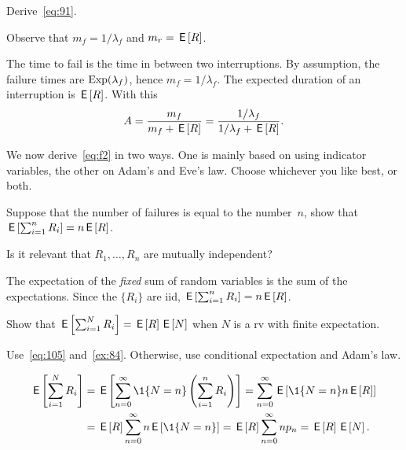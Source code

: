 \begin{exercise}\label{ex:80}
 Derive~\cref{eq:91}.
\begin{hint}
 Observe that $m_f = 1/\lambda_f$ and $m_r = \,\mathsf{E}\left[R\right]$.
\end{hint}
\begin{solution}
  The time to fail is the time in between two interruptions.
  By assumption, the failure times are $\mathrm{Exp}(\lambda_f)$, hence $m_f = 1/\lambda_f$.
  The expected duration of an interruption is $\,\mathsf{E}\left[R\right]$.   With this
\begin{equation*}
 A=\frac{m_f}{m_f + \,\mathsf{E}\left[R\right]}=\frac{1/\lambda_f }{1/\lambda_f + \,\mathsf{E}\left[R\right]}.
\end{equation*}
\end{solution}
\end{exercise}

We now derive~\cref{eq:f2} in two ways. One is mainly based on using indicator variables, the other on Adam's and Eve's law. Choose whichever you like best, or both.


\begin{exercise}\label{ex:84}
 Suppose that the number of failures is equal to the number~$n$, show that $\,\mathsf{E}\left[\sum_{i=1}^n R_i\right]=n\,\mathsf{E}\left[R\right]$.
\begin{hint}
 Is it relevant that $R_1,\ldots, R_n$ are mutually independent?
\end{hint}
\begin{solution}
  The expectation of the \emph{fixed} sum of random variables is  the sum of the expectations. Since the $\{R_i\}$ are iid,
$\,\mathsf{E}\left[\sum_{i=1}^n R_i\right]= n \,\mathsf{E}\left[R\right]$.
\end{solution}
\end{exercise}


\begin{exercise}\label{ex:16}
Show
that  $\,\mathsf{E}\left[\sum_{i=1}^N R_i \right]=\,\mathsf{E}\left[R\right] \,\mathsf{E}\left[N\right]$  when $N$ is a rv with finite expectation.
\begin{hint}
Use~\cref{eq:105} and~\cref{ex:84}. Otherwise, use conditional expectation and Adam's law.
\end{hint}
\begin{solution}
\begin{align*}
 \E{\sum_{i=1}^N R_i }
&= \E{ \sum_{n=0}^\infty \1{N=n} \left(\sum_{i=1}^n R_i \right)}
= \sum_{n=0}^\infty \E{\1{N=n} n\E{R}} \\
&= \E{R} \sum_{n=0}^\infty n \E{\1{N=n}} = \E R \sum_{n=0}^\infty n p_n
= \E R \E N.
\end{align*}
\end{solution}
\end{exercise}


